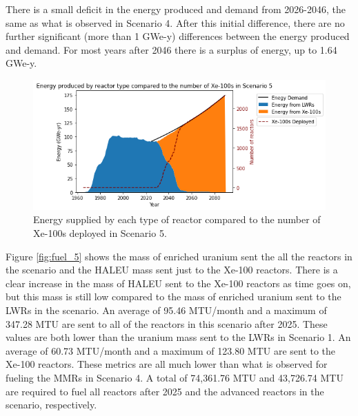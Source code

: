 There is a small deficit in the energy produced and demand from 
2026-2046, the same as what is observed in Scenario 4. After this 
initial difference, there are no further significant (more than 
1 GWe-y) differences between 
the energy produced and demand. For most years after 2046 there 
is a surplus of energy, up to 1.64 GWe-y. 

\begin{figure}
    \centering 
    \includegraphics[width=\textwidth]{../figures/energy_scenario5.png}
    \caption{Energy supplied by each type of reactor compared to the number of 
    Xe-100s deployed in Scenario 5.}
    \label{fig:energy_rx_5}
\end{figure}

Figure \ref{fig:fuel_5} shows the mass of enriched uranium sent the all  
the reactors in the scenario and the \gls{HALEU} mass sent just to the 
Xe-100 reactors. There is a clear increase in the mass of \gls{HALEU} sent 
to the Xe-100 reactors as time goes on, but this mass is still  
low compared to the mass of enriched uranium sent to the \glspl{LWR} in 
the scenario. An average of 95.46 MTU/month and a maximum of 347.28 MTU 
are sent to all of the reactors in this scenario after 2025. These 
values are both lower than the uranium mass sent to the 
\glspl{LWR} in Scenario 1. An average of 
60.73 MTU/month and a maximum of 123.80 MTU are sent to the Xe-100 reactors. 
These metrics are all much lower than what is observed 
for fueling the \glspl{MMR} in Scenario 4. A total of 74,361.76 MTU and 
43,726.74 MTU are required to fuel all reactors after 2025 and the advanced reactors 
in the scenario, respectively.


